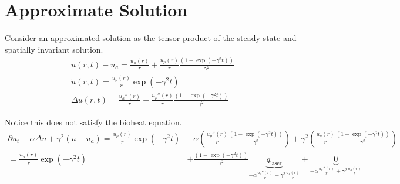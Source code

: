 \documentclass{article}         %
\theoremstyle{definition}
\theoremstyle{remark}
\begin{document}
\section{Approximate Solution}

Consider an approximated solution as the tensor product of the steady state
and spatially invariant solution.
\begin{equation} \label{AssumedAnalyticForm}
\begin{split}
 u(r,t) - u_a = 
 \frac{u_h(r)}{r} +
 \frac{u_p(r)}{r}
 \frac{\left( 1 - \exp(-\gamma^2 t)\right)}{ \gamma^2}  
\\
 \dot{u}(r,t)  =  
 \frac{u_p(r)}{r}  \exp(-\gamma^2 t)
\\
 \Delta u(r,t)  = 
 \frac{u_h''(r)}{r} 
 +
 \frac{u_p''(r)}{r} 
 \frac{\left( 1 - \exp(-\gamma^2 t)\right)}{ \gamma^2}  
\end{split}
\end{equation}

Notice this does not satisfy the bioheat equation.
\[
\begin{split}
  \partial u_t   
 - \alpha \Delta u   
 +  \gamma^2 (u  - u_a )
  = 
  \frac{u_p(r)}{r}  \exp(-\gamma^2 t)
 & - 
  \alpha
  \left(
 \frac{u_p''(r)}{r} 
 \frac{\left( 1 - \exp(-\gamma^2 t)\right)}{ \gamma^2}  
  \right)
  + 
  \gamma^2
  \left(
  \frac{u_p(r)}{r} 
 \frac{\left( 1 - \exp(-\gamma^2 t)\right)}{ \gamma^2}  
  \right)
\\
  = 
   \frac{u_p(r)}{r}  \exp(-\gamma^2 t)
 &+
 \frac{\left( 1 - \exp(-\gamma^2 t)\right)}{ \gamma^2}  
 \underbrace{q_\text{laser}}_{
  -\alpha \frac{u_p''(r)}{r} 
  + \gamma^2
  \frac{u_p(r)}{r} 
  }
  +
 \underbrace{0}_{
  -\alpha \frac{u_h''(r)}{r} 
  + \gamma^2
  \frac{u_h(r)}{r} 
  }
\end{split}
\]
\end{document}
